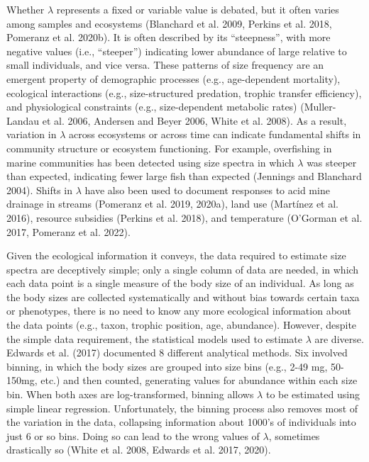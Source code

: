 \documentclass[
  12pt,
]{article}
\numberwithin{equation}
\begin{document}
Whether \(\lambda\) represents a fixed or variable value is debated, but
it often varies among samples and ecosystems (Blanchard et al. 2009,
Perkins et al. 2018, Pomeranz et al. 2020b). It is often described by
its ``steepness'', with more negative values (i.e., ``steeper'')
indicating lower abundance of large relative to small individuals, and
vice versa. These patterns of size frequency are an emergent property of
demographic processes (e.g., age-dependent mortality), ecological
interactions (e.g., size-structured predation, trophic transfer
efficiency), and physiological constraints (e.g., size-dependent
metabolic rates) (Muller-Landau et al. 2006, Andersen and Beyer 2006,
White et al. 2008). As a result, variation in \(\lambda\) across
ecosystems or across time can indicate fundamental shifts in community
structure or ecosystem functioning. For example, overfishing in marine
communities has been detected using size spectra in which \(\lambda\)
was steeper than expected, indicating fewer large fish than expected
(Jennings and Blanchard 2004). Shifts in \(\lambda\) have also been used
to document responses to acid mine drainage in streams (Pomeranz et al.
2019, 2020a), land use (Martínez et al. 2016), resource subsidies
(Perkins et al. 2018), and temperature (O'Gorman et al. 2017, Pomeranz
et al. 2022).

Given the ecological information it conveys, the data required to
estimate size spectra are deceptively simple; only a single column of
data are needed, in which each data point is a single measure of the
body size of an individual. As long as the body sizes are collected
systematically and without bias towards certain taxa or phenotypes,
there is no need to know any more ecological information about the data
points (e.g., taxon, trophic position, age, abundance). However, despite
the simple data requirement, the statistical models used to estimate
\(\lambda\) are diverse. Edwards et al. (2017) documented 8 different
analytical methods. Six involved binning, in which the body sizes are
grouped into size bins (e.g., 2-49 mg, 50-150mg, etc.) and then counted,
generating values for abundance within each size bin. When both axes are
log-transformed, binning allows \(\lambda\) to be estimated using simple
linear regression. Unfortunately, the binning process also removes most
of the variation in the data, collapsing information about 1000's of
individuals into just 6 or so bins. Doing so can lead to the wrong
values of \(\lambda\), sometimes drastically so (White et al. 2008,
Edwards et al. 2017, 2020).
\end{document}
